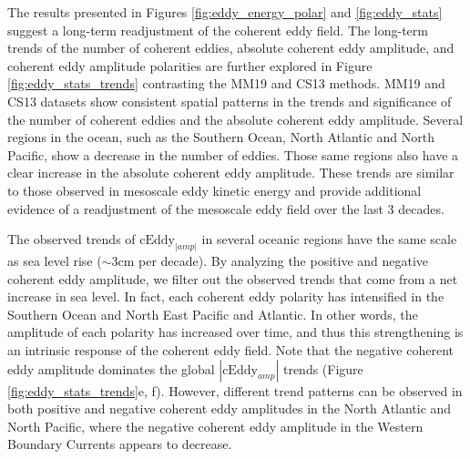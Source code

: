 \documentclass[draft,linenumbers]{agujournal2019}
\newcommand{\cEddy}{\textrm{cEddy}}
\begin{document}
	The results presented in Figures \ref{fig:eddy_energy_polar} and \ref{fig:eddy_stats} suggest a long-term readjustment of the coherent eddy field. 
	The long-term trends of the number of coherent eddies, absolute coherent eddy amplitude, and coherent eddy amplitude polarities are further explored in Figure \ref{fig:eddy_stats_trends} contrasting the MM19 and CS13 methods. 
	MM19 and CS13 datasets show consistent spatial patterns in the trends and significance of the number of coherent eddies and the absolute coherent eddy amplitude. 
	Several regions in the ocean, such as the Southern Ocean, North Atlantic and North Pacific, show a decrease in the number of eddies. Those same regions also have a clear increase in the absolute coherent eddy amplitude. 
	These trends are similar to those observed in mesoscale eddy kinetic energy \citep{Martinez_Kinetic_2021} and provide additional evidence of a readjustment of the mesoscale eddy field over the last 3 decades. 

	The observed trends of $\cEddy_{|amp|}$ in several oceanic regions have the same scale as sea level rise ($\sim$3cm per decade). By analyzing the positive and negative coherent eddy amplitude, we filter out the observed trends that come from a net increase in sea level. 
	In fact, each coherent eddy polarity has intensified in the Southern Ocean and North East Pacific and Atlantic. 
	In other words, the amplitude of each polarity has increased over time, and thus this strengthening is an intrinsic response of the coherent eddy field. Note that the negative coherent eddy amplitude dominates the global $|\cEddy_{amp}|$ trends (Figure \ref{fig:eddy_stats_trends}e, f). However, different trend patterns can be observed in both positive and negative coherent eddy amplitudes in the North Atlantic and North Pacific, where the negative coherent eddy amplitude in the  Western Boundary Currents appears to decrease.
\end{document}
